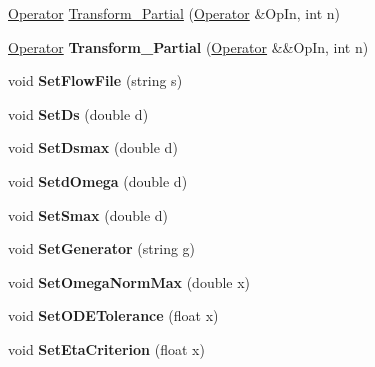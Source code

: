 \begin{DoxyCompactItemize}
\hyperlink{classOperator}{Operator} \hyperlink{classIMSRGSolver_a7313cfb167c0daba014ea4b13f17a7e5}{Transform\+\_\+\+Partial} (\hyperlink{classOperator}{Operator} \&Op\+In, int n)
\item 
\mbox{\label{classIMSRGSolver_a3475c5dcf964cb623a8a921f73816ab4}} 
\hyperlink{classOperator}{Operator} {\bfseries Transform\+\_\+\+Partial} (\hyperlink{classOperator}{Operator} \&\&Op\+In, int n)
\item 
\mbox{\label{classIMSRGSolver_aaa7c2d56b6347a19e87924340af922dc}} 
void {\bfseries Set\+Flow\+File} (string s)
\item 
\mbox{\label{classIMSRGSolver_a6de0ad4240a6c2942ca316f12e2fa6c0}} 
void {\bfseries Set\+Ds} (double d)
\item 
\mbox{\label{classIMSRGSolver_af13b27df1b2720dcceb97d72f6746d5d}} 
void {\bfseries Set\+Dsmax} (double d)
\item 
\mbox{\label{classIMSRGSolver_a9427ea6faa3768b77cdff8e6a6e551de}} 
void {\bfseries Setd\+Omega} (double d)
\item 
\mbox{\label{classIMSRGSolver_a951d52f2651e9a96f08aea35b86c38a9}} 
void {\bfseries Set\+Smax} (double d)
\item 
\mbox{\label{classIMSRGSolver_a456d557bccadef31de84ad6fa0dd4ab2}} 
void {\bfseries Set\+Generator} (string g)
\item 
\mbox{\label{classIMSRGSolver_ade3ac5fb27b1c51cded78c88b43ff115}} 
void {\bfseries Set\+Omega\+Norm\+Max} (double x)
\item 
\mbox{\label{classIMSRGSolver_a8e6e5fb61eb1380be1e73c8bea9f1c31}} 
void {\bfseries Set\+O\+D\+E\+Tolerance} (float x)
\item 
\mbox{\label{classIMSRGSolver_a3ef8306f6737a8b189ad64e95cede6a0}} 
void {\bfseries Set\+Eta\+Criterion} (float x)
\item 
\mbox{\label{classIMSRGSolver_a2d818538905870ddd3ff073a8a9e701c}} 

\end{DoxyCompactItemize}

